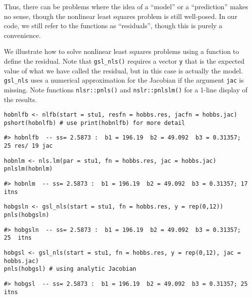 Thus, there can be problems where the idea of a ``model'' or a ``prediction''
makes no sense, though the nonlinear least squares problem is still
well-posed. In our code, we still refer to the functions as ``residuals'',
though this is purely a convenience.

We illustrate how to solve nonlinear least squares problems using
a function to define the residual. Note that \texttt{gsl\_nls()} requires
a vector \texttt{y} that is the expected value of what we have called the
residual, but in this case is actually the model. \texttt{gsl\_nls} uses
a numerical approximation for the Jacobian if the argument \texttt{jac}
is missing. Note functions \texttt{nlsr::pnls()} and \texttt{nslr::pnlslm()} for a
1-line display of the results.

\begin{verbatim}
hobnlfb <- nlfb(start = stu1, resfn = hobbs.res, jacfn = hobbs.jac)
pshort(hobnlfb) # use print(hobnlfb) for more detail
\end{verbatim}

\begin{verbatim}
#> hobnlfb  -- ss= 2.5873 :  b1 = 196.19  b2 = 49.092  b3 = 0.31357; 25 res/ 19 jac
\end{verbatim}

\begin{verbatim}
hobnlm <- nls.lm(par = stu1, fn = hobbs.res, jac = hobbs.jac)
pnlslm(hobnlm)  
\end{verbatim}

\begin{verbatim}
#> hobnlm  -- ss= 2.5873 :  b1 = 196.19  b2 = 49.092  b3 = 0.31357; 17  itns
\end{verbatim}

\begin{verbatim}
hobgsln <- gsl_nls(start = stu1, fn = hobbs.res, y = rep(0,12))
pnls(hobgsln)
\end{verbatim}

\begin{verbatim}
#> hobgsln  -- ss= 2.5873 :  b1 = 196.19  b2 = 49.092  b3 = 0.31357; 25  itns
\end{verbatim}

\begin{verbatim}
hobgsl <- gsl_nls(start = stu1, fn = hobbs.res, y = rep(0,12), jac = hobbs.jac)
pnls(hobgsl) # using analytic Jacobian
\end{verbatim}

\begin{verbatim}
#> hobgsl  -- ss= 2.5873 :  b1 = 196.19  b2 = 49.092  b3 = 0.31357; 25  itns
\end{verbatim}

